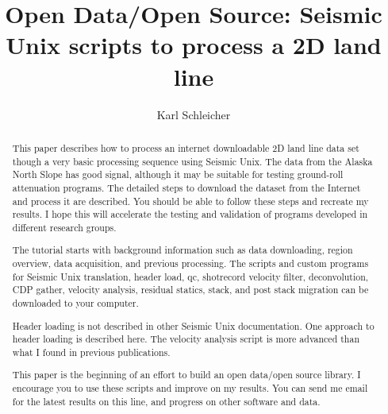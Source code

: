 
\title{Open Data/Open Source: Seismic Unix scripts to process a 2D land line}               %
\author{Karl Schleicher}

\address{
k\_schleicher@hotmail.com \\
John A. and Katherine G. Jackson School of Geosciences \\
The University of Texas at Austin \\
University Station, Box X \\
Austin, TX 78713-8924}

\maketitle

\begin{abstract}
This paper describes how to process an internet downloadable 2D land 
line data set though a very basic processing sequence using Seismic 
Unix. The data from the Alaska North Slope has good signal, 
although it may be suitable for testing ground-roll attenuation 
programs.  The detailed steps to download the dataset from the 
Internet and process it are described.  You should be able to 
follow these steps and recreate my results.  I hope this will 
accelerate the testing and validation of programs developed in different
research groups.
\par
The tutorial starts with background information such as data downloading,
region overview, data acquisition, and previous processing.  The
scripts and custom programs for Seismic Unix translation, header load, 
qc, shotrecord velocity filter, deconvolution, CDP gather, velocity 
analysis, residual statics, stack, and post stack migration can be 
downloaded to your computer.

Header loading is not described in other Seismic Unix documentation.
One approach to header loading is described here.  The velocity
analysis script is more advanced than what I found in previous publications.

This paper is the beginning of an effort to build an open data/open source 
library.  I encourage you to use these scripts and improve on my results.  
You can send me email for the latest results on this line, and progress on other 
software and data.
\end{abstract}

